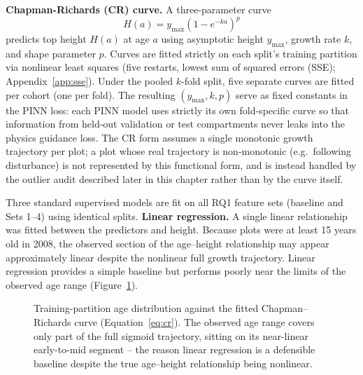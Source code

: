 \documentclass[11pt,a4paper]{report}
\begin{document}
\textbf{Chapman-Richards (CR) curve.} A three-parameter curve
\begin{equation}
H(a) = y_{\max}\left(1-e^{-ka}\right)^{p}
\label{eq:cr}
\end{equation}
predicts top height $H(a)$ at age $a$ using asymptotic height $y_{\max}$, growth rate $k$, and shape parameter $p$. Curves are fitted strictly on each split's training partition via nonlinear least squares (five restarts, lowest sum of squared errors (SSE); Appendix~\ref{app:sse}). Under the pooled $k$-fold split, five separate curves are fitted per cohort (one per fold). The resulting $(y_{\max}, k, p)$ serve as fixed constants in the PINN loss: each PINN model uses strictly its own fold-specific curve so that information from held-out validation or test compartments never leaks into the physics guidance loss. The CR form assumes a single monotonic growth trajectory per plot; a plot whose real trajectory is non-monotonic (e.g.\ following disturbance) is not represented by this functional form, and is instead handled by the outlier audit described later in this chapter rather than by the curve itself.

Three standard supervised models are fit on all RQ1 feature sets (baseline and Sets 1–4) using identical splits.
\textbf{Linear regression.} A single linear relationship was fitted between the predictors and height. Because plots were at least 15 years old in 2008, the observed section of the age--height relationship may appear approximately linear despite the nonlinear full growth trajectory. Linear regression provides a simple baseline but performs poorly near the limits of the observed age range (Figure~\ref{fig:age-linearity}).

\begin{figure}[!htbp]
\centering
{}
\caption{Training-partition age distribution against the fitted Chapman--Richards curve
(Equation~\ref{eq:cr}). The observed age range covers only part of the full sigmoid trajectory,
sitting on its near-linear early-to-mid segment -- the reason linear regression is a defensible
baseline despite the true age--height relationship being nonlinear.}
\label{fig:age-linearity}
\end{figure}
\end{document}
